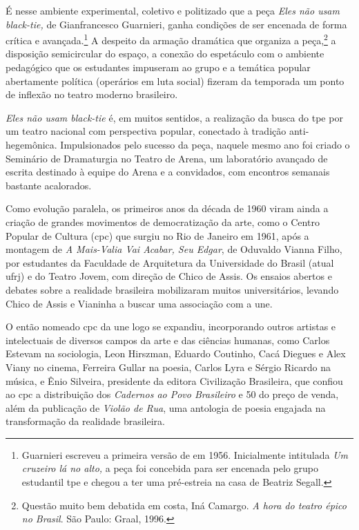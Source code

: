 É nesse ambiente experimental, coletivo e politizado que a peça
{\it Eles não usam black-tie,} de Gianfrancesco Guarnieri, ganha
condições de ser encenada de forma crítica e avançada.\footnote{Guarnieri
  escreveu a primeira versão de em 1956. Inicialmente intitulada {\it Um
  cruzeiro lá no alto,} a peça foi concebida para ser encenada pelo
  grupo estudantil {\sc tpe} e chegou a ter uma pré-estreia na casa de Beatriz
  Segall.} A despeito da armação dramática que organiza a
peça,\footnote{Questão muito bem debatida em {\sc costa}, Iná Camargo. {\it A
  hora do teatro épico no Brasil}. São Paulo: Graal, 1996.} a
disposição semicircular do espaço, a conexão do espetáculo com o
ambiente pedagógico que os estudantes impuseram ao grupo e a temática
popular abertamente política (operários em luta social) fizeram da
temporada um ponto de inflexão no teatro moderno brasileiro.

{\it Eles não usam black-tie} é, em muitos sentidos, a realização da
busca do {\sc tpe} por um teatro nacional com perspectiva popular, conectado à
tradição anti-hegemônica. Impulsionados pelo sucesso da peça, naquele
mesmo ano foi criado o Seminário de Dramaturgia no Teatro de Arena, um
laboratório avançado de escrita destinado à equipe do Arena e a
convidados, com encontros semanais bastante acalorados.

Como evolução paralela, os primeiros anos da década de 1960 viram ainda
a criação de grandes movimentos de democratização da arte, como o Centro
Popular de Cultura ({\sc cpc}) que surgiu no Rio de Janeiro em 1961, após a
montagem de {\it A Mais-Valia Vai Acabar, Seu Edgar}, de Oduvaldo Vianna
Filho, por estudantes da Faculdade de Arquitetura da Universidade do
Brasil (atual {\sc ufrj}) e do Teatro Jovem, com direção de Chico de Assis. Os
ensaios abertos e debates sobre a realidade brasileira mobilizaram
muitos universitários, levando Chico de Assis e Vianinha a buscar uma
associação com a {\sc une}.

O então nomeado {\sc cpc} da {\sc une} logo se expandiu, incorporando outros
artistas e intelectuais de diversos campos da arte e das ciências
humanas, como Carlos Estevam na sociologia, Leon Hirszman, Eduardo
Coutinho, Cacá Diegues e Alex Viany no cinema, Ferreira Gullar na
poesia, Carlos Lyra e Sérgio Ricardo na música, e Ênio Silveira,
presidente da editora Civilização Brasileira, que confiou ao {\sc cpc} a
distribuição dos {\it Cadernos ao Povo Brasileiro} e 50
do preço de venda, além da publicação de {\it Violão de Rua}, uma
antologia de poesia engajada na transformação da realidade brasileira.

